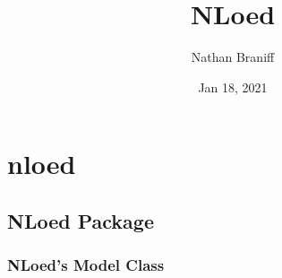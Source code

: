 \documentclass[letterpaper,10pt,english,openany,oneside]{sphinxmanual}
\title{NLoed}
\date{Jan 18, 2021}
\author{Nathan Braniff}
\begin{document}
\pagestyle{empty}
\sphinxmaketitle
\pagestyle{plain}
\sphinxtableofcontents
\pagestyle{normal}
\label{\detokenize{index::doc}}



\chapter{nloed}
\label{\detokenize{modules:nloed}}\label{\detokenize{modules::doc}}

\section{NLoed Package}
\label{\detokenize{nloed:nloed-package}}\label{\detokenize{nloed::doc}}

\subsection{NLoed’s Model Class}
\label{\detokenize{nloed:module-nloed.model}}\label{\detokenize{nloed:nloed-s-model-class}}
\end{document}
